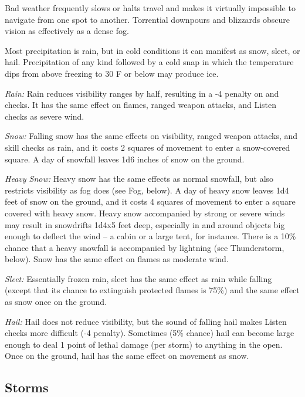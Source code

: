 Bad weather frequently slows or halts travel and makes it virtually impossible 
to navigate from one spot to another. Torrential downpours and blizzards obscure 
vision as effectively as a dense fog.

Most precipitation is rain, but in cold conditions it can manifest as snow, sleet, 
or hail. Precipitation of any kind followed by a cold snap in which the temperature 
dips from above freezing to 30\textdegree{} F or below may produce ice.

\textit{Rain:} Rain 
reduces visibility ranges by half, resulting in a -4 penalty on  and  
checks. It has the same effect on flames, ranged weapon attacks, and Listen checks 
as severe wind.

\textit{Snow:} Falling snow has the same effects on visibility, ranged weapon attacks, 
and skill checks as rain, and it costs 2 squares of movement to enter a snow-covered 
square. A day of snowfall leaves 1d6 inches of snow on the ground.

\textit{Heavy Snow:} Heavy snow has the same effects as normal snowfall, but also 
restricts visibility as fog does (see Fog, below). A day of heavy snow leaves 1d4 
feet of snow on the ground, and it costs 4 squares of movement to enter a square 
covered with heavy snow. Heavy snow accompanied by strong or severe winds may result 
in snowdrifts 1d4x5 feet deep, especially in and around objects 
big enough to deflect the wind -- a cabin or a large tent, for instance. There is 
a 10\% chance that a heavy snowfall is accompanied by lightning (see Thunderstorm, 
below). Snow has the same effect on flames as moderate wind.

\textit{Sleet:} Essentially frozen rain, sleet has the same effect as rain while 
falling (except that its chance to extinguish protected flames is 75\%) and the 
same effect as snow once on the ground. 

\textit{Hail:} Hail does not reduce visibility, but the sound of falling hail makes 
Listen checks more difficult (-4 penalty). Sometimes (5\% chance) hail can become 
large enough to deal 1 point of lethal damage (per storm) to anything in the open. 
Once on the ground, hail has the same effect on movement as snow.

\subsection{Storms}

